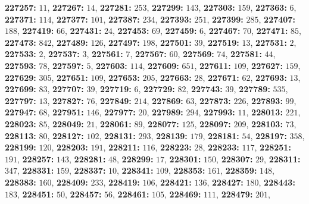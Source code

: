 \textsf{\bfseries 227257:} $11$, \textsf{\bfseries 227267:} $14$, \textsf{\bfseries 227281:} $253$, \textsf{\bfseries 227299:} $143$, \textsf{\bfseries 227303:} $159$, \textsf{\bfseries 227363:} $6$, \textsf{\bfseries 227371:} $114$, \textsf{\bfseries 227377:} $101$, \textsf{\bfseries 227387:} $234$, \textsf{\bfseries 227393:} $251$, \textsf{\bfseries 227399:} $285$, \textsf{\bfseries 227407:} $188$, \textsf{\bfseries 227419:} $66$, \textsf{\bfseries 227431:} $24$, \textsf{\bfseries 227453:} $69$, \textsf{\bfseries 227459:} $6$, \textsf{\bfseries 227467:} $70$, \textsf{\bfseries 227471:} $85$, \textsf{\bfseries 227473:} $842$, \textsf{\bfseries 227489:} $126$, \textsf{\bfseries 227497:} $198$, \textsf{\bfseries 227501:} $39$, \textsf{\bfseries 227519:} $13$, \textsf{\bfseries 227531:} $2$, \textsf{\bfseries 227533:} $2$, \textsf{\bfseries 227537:} $3$, \textsf{\bfseries 227561:} $7$, \textsf{\bfseries 227567:} $60$, \textsf{\bfseries 227569:} $74$, \textsf{\bfseries 227581:} $44$, \textsf{\bfseries 227593:} $78$, \textsf{\bfseries 227597:} $5$, \textsf{\bfseries 227603:} $114$, \textsf{\bfseries 227609:} $651$, \textsf{\bfseries 227611:} $109$, \textsf{\bfseries 227627:} $159$, \textsf{\bfseries 227629:} $305$, \textsf{\bfseries 227651:} $109$, \textsf{\bfseries 227653:} $205$, \textsf{\bfseries 227663:} $28$, \textsf{\bfseries 227671:} $62$, \textsf{\bfseries 227693:} $13$, \textsf{\bfseries 227699:} $83$, \textsf{\bfseries 227707:} $39$, \textsf{\bfseries 227719:} $6$, \textsf{\bfseries 227729:} $82$, \textsf{\bfseries 227743:} $39$, \textsf{\bfseries 227789:} $535$, \textsf{\bfseries 227797:} $13$, \textsf{\bfseries 227827:} $76$, \textsf{\bfseries 227849:} $214$, \textsf{\bfseries 227869:} $63$, \textsf{\bfseries 227873:} $226$, \textsf{\bfseries 227893:} $99$, \textsf{\bfseries 227947:} $68$, \textsf{\bfseries 227951:} $146$, \textsf{\bfseries 227977:} $20$, \textsf{\bfseries 227989:} $294$, \textsf{\bfseries 227993:} $11$, \textsf{\bfseries 228013:} $221$, \textsf{\bfseries 228023:} $85$, \textsf{\bfseries 228049:} $21$, \textsf{\bfseries 228061:} $89$, \textsf{\bfseries 228077:} $125$, \textsf{\bfseries 228097:} $209$, \textsf{\bfseries 228103:} $73$, \textsf{\bfseries 228113:} $80$, \textsf{\bfseries 228127:} $102$, \textsf{\bfseries 228131:} $293$, \textsf{\bfseries 228139:} $179$, \textsf{\bfseries 228181:} $54$, \textsf{\bfseries 228197:} $358$, \textsf{\bfseries 228199:} $120$, \textsf{\bfseries 228203:} $191$, \textsf{\bfseries 228211:} $116$, \textsf{\bfseries 228223:} $28$, \textsf{\bfseries 228233:} $117$, \textsf{\bfseries 228251:} $191$, \textsf{\bfseries 228257:} $143$, \textsf{\bfseries 228281:} $48$, \textsf{\bfseries 228299:} $17$, \textsf{\bfseries 228301:} $150$, \textsf{\bfseries 228307:} $29$, \textsf{\bfseries 228311:} $347$, \textsf{\bfseries 228331:} $159$, \textsf{\bfseries 228337:} $10$, \textsf{\bfseries 228341:} $109$, \textsf{\bfseries 228353:} $161$, \textsf{\bfseries 228359:} $148$, \textsf{\bfseries 228383:} $160$, \textsf{\bfseries 228409:} $233$, \textsf{\bfseries 228419:} $106$, \textsf{\bfseries 228421:} $136$, \textsf{\bfseries 228427:} $180$, \textsf{\bfseries 228443:} $183$, \textsf{\bfseries 228451:} $50$, \textsf{\bfseries 228457:} $56$, \textsf{\bfseries 228461:} $105$, \textsf{\bfseries 228469:} $111$, \textsf{\bfseries 228479:} $201$, 
